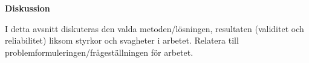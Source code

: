 \begin{mdframed}[innertopmargin=10pt, innerbottommargin=10pt, innerleftmargin=10pt, innerrightmargin=10pt, skipabove=10pt, skipbelow=10pt, roundcorner=10pt]
    \textbf{Diskussion}
    
    I detta avsnitt diskuteras den valda metoden/lösningen, resultaten (validitet och reliabilitet) liksom styrkor och svagheter i arbetet. Relatera till problemformuleringen/frågeställningen för arbetet.
    \end{mdframed}
    